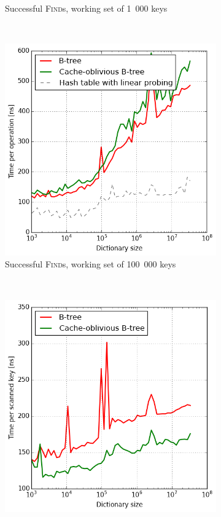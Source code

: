 \begin{figure}
\begin{subfigure}[t]{0.45\textwidth}
	\caption{Successful \textsc{Find}s, working set of 1~000 keys}
\end{subfigure}
~
\begin{subfigure}[t]{0.45\textwidth}
	\includegraphics[width=\textwidth]{img/performance/cob-performance-4}
	\caption{Successful \textsc{Find}s, working set of 100~000 keys}
\end{subfigure}
~
\begin{subfigure}[t]{0.45\textwidth}
	\includegraphics[width=\textwidth]{img/performance/cob-performance-5}

\end{subfigure}
\end{figure}
